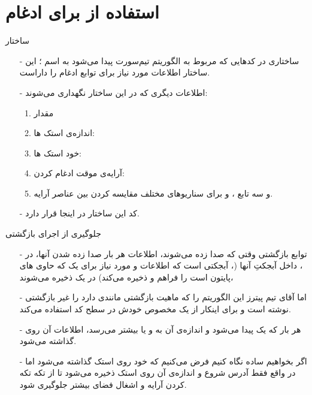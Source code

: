\section{استفاده از  برای ادغام}
\begin{frame}{ساختار }
\begin{itemize}\itemr
\item[-]
ساختاری در کد‌هایی که مربوط به الگوریتم تیم‌سورت پیدا می‌شود به اسم ؛ این ساختار اطلاعات مورد نیاز برای توابع ادغام را داراست.

\item[-]
اطلاعات دیگری که در این ساختار نگهداری می‌شوند:
\begin{enumerate}\itemr
\item 
مقدار 

\item 
اندازه‌ی استک ها:

\item 
خود استک ها:

\item 
آرایه‌ی موقت ادغام کردن:

\item 
و سه تابع
،
 و
برای سناریو‌های مختلف مقایسه کردن بین عناصر آرایه.
\end{enumerate}
\vspace{-15pt}
\item[-]
کد این ساختار در اینجا
قرار دارد.
\end{itemize}
\end{frame}

\begin{frame}{جلوگیری از اجرای بازگشتی}
\begin{itemize}\itemr
\item[-]
توابع بازگشتی وقتی که صدا زده می‌شوند، اطلاعات هر بار صدا زده شدن آنها، در
،
داخل آبجکتِ
آنها (، آبجکتی است که اطلاعات و  مورد نیاز برای یک  که حاوی ‌های پایتون است را فراهم و ذخیره می‌کند) در یک  ذخیره می‌شوند،

\item[-]
اما آقای تیم پیترز این الگوریتم را که ماهیت بازگشتی مانندی دارد را غیر بازگشتی نوشته است و برای اینکار از یک  مخصوص خودش در سطح کد استفاده می‌کند.

\item[-]
هر بار که یک  پیدا می‌شود و اندازه‌ی آن به  و یا بیشتر می‌رسد، اطلاعات آن روی  گذاشته می‌شود.

\item[-]
اگر بخواهیم ساده نگاه کنیم فرض می‌کنیم که خود  روی استک گذاشته می‌شود اما در واقع فقط آدرس شروع و اندازه‌ی آن روی استک ذخیره می‌شود تا از تکه تکه کردن آرایه و اشغال فضای بیشتر جلوگیری شود.
\end{itemize}
\end{frame}

